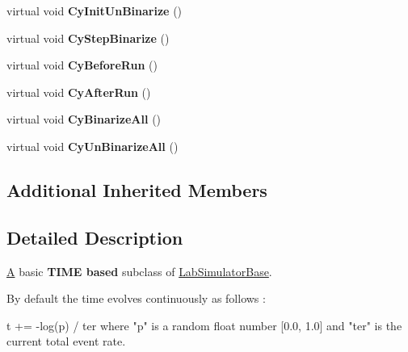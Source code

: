 \begin{DoxyCompactItemize}
\item 
\hypertarget{classelps_1_1_lab_simulator_time_a2b7d6620ae493676adf1001065599d5d}{virtual void {\bfseries Cy\+Init\+Un\+Binarize} ()}\label{classelps_1_1_lab_simulator_time_a2b7d6620ae493676adf1001065599d5d}

\item 
\hypertarget{classelps_1_1_lab_simulator_time_a129e0084444b0f68bc7da61ad633bcde}{virtual void {\bfseries Cy\+Step\+Binarize} ()}\label{classelps_1_1_lab_simulator_time_a129e0084444b0f68bc7da61ad633bcde}

\item 
\hypertarget{classelps_1_1_lab_simulator_time_a1bb44810c2e9577391c6ab6f88fdcf65}{virtual void {\bfseries Cy\+Before\+Run} ()}\label{classelps_1_1_lab_simulator_time_a1bb44810c2e9577391c6ab6f88fdcf65}

\item 
\hypertarget{classelps_1_1_lab_simulator_time_abcfda9bddfbd73fb175222616a5e7e6c}{virtual void {\bfseries Cy\+After\+Run} ()}\label{classelps_1_1_lab_simulator_time_abcfda9bddfbd73fb175222616a5e7e6c}

\item 
\hypertarget{classelps_1_1_lab_simulator_time_a22e6b4ec2608b8853a989b50370b30dd}{virtual void {\bfseries Cy\+Binarize\+All} ()}\label{classelps_1_1_lab_simulator_time_a22e6b4ec2608b8853a989b50370b30dd}

\item 
\hypertarget{classelps_1_1_lab_simulator_time_a1b2d0167ea05ba896e7abecab629b28a}{virtual void {\bfseries Cy\+Un\+Binarize\+All} ()}\label{classelps_1_1_lab_simulator_time_a1b2d0167ea05ba896e7abecab629b28a}

\end{DoxyCompactItemize}
\subsection*{Additional Inherited Members}


\subsection{Detailed Description}
\hyperlink{class_a}{A} basic {\bfseries T\+I\+M\+E based} subclass of \hyperlink{classelps_1_1_lab_simulator_base}{Lab\+Simulator\+Base}.

By default the time evolves continuously as follows \+: \begin{DoxyVerb}    t += -log(p) / ter
    where "p" is a random float number [0.0, 1.0] and "ter" is the current total event rate.
\end{DoxyVerb}


